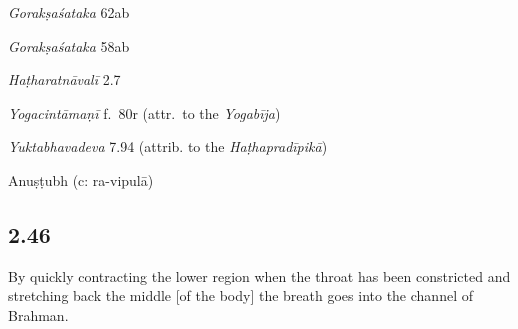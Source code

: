 \begin{ekdosis}
\begin{sources}[hp02_045]
\emph{Gorakṣaśataka} 62ab

\begin{versinnote}
\end{versinnote}
\emph{Gorakṣaśataka} 58ab

\begin{versinnote}
\end{versinnote}
\end{sources}

\begin{testimonia}[hp02_045]
\emph{Haṭharatnāvalī} 2.7

\begin{versinnote}
\end{versinnote} 

\emph{Yogacintāmaṇī} f.~80r (attr.~to the \emph{Yogabīja})

\begin{versinnote}
\end{versinnote}

\emph{Yuktabhavadeva} 7.94 (attrib. to the \emph{Haṭhapradīpikā})

\begin{versinnote}
\end{versinnote}
\end{testimonia}


\begin{metre}[hp02_045]
Anuṣṭubh (c: ra-vipulā)
\end{metre}

\subsection*{2.46}
\begin{translation}[hp02_046]
By quickly contracting the lower region when the throat has been constricted and stretching back the middle [of the body] the breath goes into the channel of Brahman.
\end{translation}


\end{ekdosis}
